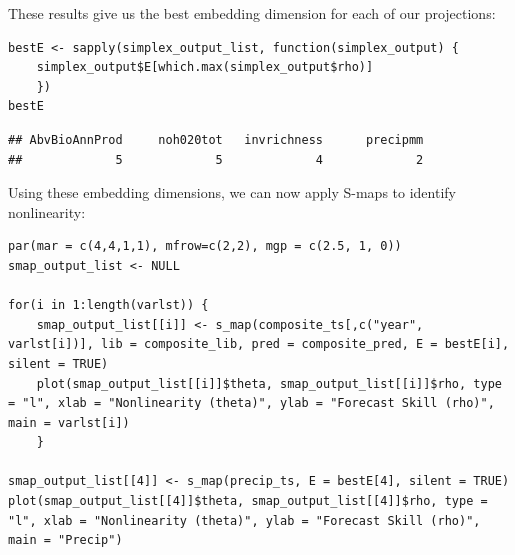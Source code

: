 These results give us the best embedding dimension for each of our projections:

\begin{lstlisting}
bestE <- sapply(simplex_output_list, function(simplex_output) {
    simplex_output$E[which.max(simplex_output$rho)]
    })
bestE
\end{lstlisting}

\begin{lstlisting}[backgroundcolor=\color{white}, commentstyle=\ttfamily]
## AbvBioAnnProd     noh020tot   invrichness      precipmm 
##             5             5             4             2
\end{lstlisting}

Using these embedding dimensions, we can now apply S-maps to identify nonlinearity:

\begin{lstlisting}
par(mar = c(4,4,1,1), mfrow=c(2,2), mgp = c(2.5, 1, 0))
smap_output_list <- NULL

for(i in 1:length(varlst)) {
    smap_output_list[[i]] <- s_map(composite_ts[,c("year", varlst[i])], lib = composite_lib, pred = composite_pred, E = bestE[i], silent = TRUE)
    plot(smap_output_list[[i]]$theta, smap_output_list[[i]]$rho, type = "l", xlab = "Nonlinearity (theta)", ylab = "Forecast Skill (rho)", main = varlst[i])
    }

smap_output_list[[4]] <- s_map(precip_ts, E = bestE[4], silent = TRUE)
plot(smap_output_list[[4]]$theta, smap_output_list[[4]]$rho, type = "l", xlab = "Nonlinearity (theta)", ylab = "Forecast Skill (rho)", main = "Precip")
\end{lstlisting}

